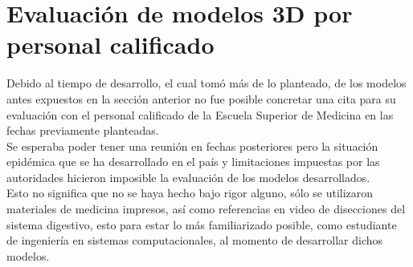 \section{Evaluación de modelos 3D por personal calificado}
Debido al tiempo de desarrollo, el cual tomó más de lo planteado, de los modelos antes expuestos en la sección anterior no fue posible concretar una cita para su evaluación con el personal calificado  de la Escuela Superior de Medicina en las fechas previamente planteadas.\\

Se esperaba poder tener una reunión en fechas posteriores pero la situación epidémica que se ha desarrollado en el país y limitaciones impuestas por las autoridades hicieron imposible la evaluación de los modelos desarrollados.\\

Esto no significa que no se haya hecho bajo rigor alguno, sólo se utilizaron materiales de medicina impresos, así como referencias en video de disecciones del sistema digestivo, esto para estar lo más familiarizado posible, como estudiante de ingeniería en sistemas computacionales, al momento de desarrollar dichos modelos.\\
